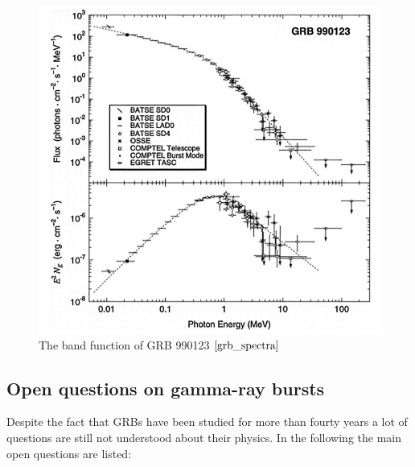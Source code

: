 \documentclass[12pt, a4paper,titlepage]{article}
\numberwithin{equation}{section}
\numberwithin{figure}{section}
\begin{document}
\begin{figure}[H]
\centering
\includegraphics[width=130.0mm]{images/grb_spectra.png}
\caption{The band function of GRB 990123 $\cite{grb_spectra}$}
\label{fig:grb_band}
\end{figure}

\subsection{Open questions on gamma-ray bursts}

Despite the fact that GRBs have been studied for more than fourty years a lot of questions are still not understood about their physics\cite{grb19}. In the following the main open questions are listed:
\end{document}
